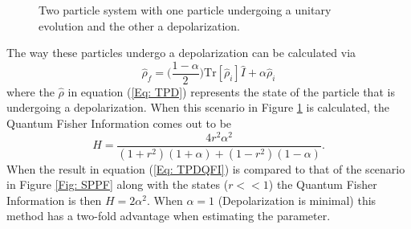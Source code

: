 \documentclass[twocolumn]{article}
\begin{document}
\begin{figure}[ht]
    \caption{\footnotesize{Two particle system with one particle undergoing a unitary evolution and the other a depolarization.}}
    \label{Fig: TPD}
\end{figure}
\par \noindent
The way these particles undergo a depolarization can be calculated via
\begin{equation}\label{Eq: TPD}
\hat{\rho}_f=\Big(\frac{1-\alpha}{2}\Big)\text{Tr}[\hat{\rho}_i]\hat{I}+\alpha\hat{\rho}_i
\end{equation}
where the $\hat{\rho}$ in equation (\ref{Eq: TPD}) represents the state of the particle that is undergoing a depolarization. When this scenario in Figure \ref{Fig: TPD} is calculated, the Quantum Fisher Information comes out to be
\begin{equation}\label{Eq: TPDQFI}
H=\frac{4r^2\alpha^2}{(1+r^2)(1+\alpha)+(1-r^2)(1-\alpha)}.
\end{equation}
When the result in equation (\ref{Eq: TPDQFI}) is compared to that of the scenario in Figure \ref{Fig: SPPF} along with the states ($r<<1$) the Quantum Fisher Information is then $H=2\alpha^2$. When $\alpha=1$ (Depolarization is minimal) this method has a two-fold advantage when estimating the parameter.
\end{document}
